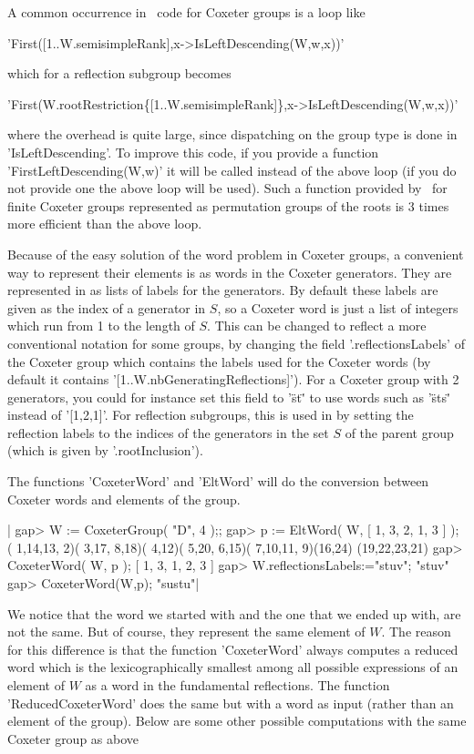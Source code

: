 A  common occurrence in \CHEVIE\ code for Coxeter groups is a loop like\:

'First([1..W.semisimpleRank],x->IsLeftDescending(W,w,x))'

which for a reflection subgroup becomes

'First(W.rootRestriction\{[1..W.semisimpleRank]\},x->IsLeftDescending(W,w,x))'

where  the overhead is quite large, since  dispatching on the group type is
done in 'IsLeftDescending'. To improve this code, if you provide a function
'FirstLeftDescending(W,w)'  it will be called instead of the above loop (if
you  do  not  provide  one  the  above  loop will be used). Such a function
provided  by \CHEVIE\ for finite  Coxeter groups represented as permutation
groups of the roots is 3 times more efficient than the above loop.

Because of  the easy  solution of  the word  problem in  Coxeter groups,
a  convenient  way  to  represent  their elements is  as  words  in  the
Coxeter  generators.  They are  represented  in  {\CHEVIE} as  lists  of
labels  for  the  generators.  By  default these  labels  are  given  as
the  index  of  a  generator  in  $S$, so  a  Coxeter  word  is  just  a
list  of  integers  which  run  from  1  to  the  length  of  $S$.  This
can  be  changed  to  reflect  a more  conventional  notation  for  some
groups, by changing the field  '.reflectionsLabels' of the Coxeter group
which contains  the labels  used for  the Coxeter  words (by  default it
contains '[1..W.nbGeneratingReflections]').  For a Coxeter group  with 2
generators, you  could for instance  set this  field to '\"st\"'  to use
words such as '\"sts\"' instead  of '[1,2,1]'. For reflection subgroups,
this  is used  in {\CHEVIE}  by setting  the reflection  labels to  the
indices of the generators  in the set $S$ of the  parent group (which is
given by '.rootInclusion').

The functions 'CoxeterWord' and 'EltWord' will do the conversion between
Coxeter words and elements of the group.

|    gap> W := CoxeterGroup( "D", 4 );;
    gap> p := EltWord( W, [ 1, 3, 2, 1, 3 ] );
    ( 1,14,13, 2)( 3,17, 8,18)( 4,12)( 5,20, 6,15)( 7,10,11, 9)(16,24)
    (19,22,23,21)
    gap> CoxeterWord( W, p );
    [ 1, 3, 1, 2, 3 ]
    gap> W.reflectionsLabels:="stuv";
    "stuv"
    gap> CoxeterWord(W,p);
    "sustu"|

We  notice  that  the  word  we   started  with  and  the  one  that  we
ended  up  with,  are  not  the same.  But  of  course,  they  represent
the  same  element of  $W$.  The  reason  for  this difference  is  that
the  function 'CoxeterWord'  always  computes a  reduced  word which  is
the  lexicographically smallest  among  all possible  expressions of  an
element of  $W$ as a word  in the fundamental reflections.  The function
'ReducedCoxeterWord' does the same but with a word as input (rather than
an element  of the  group). Below are  some other  possible computations
with the same Coxeter group as above\:

